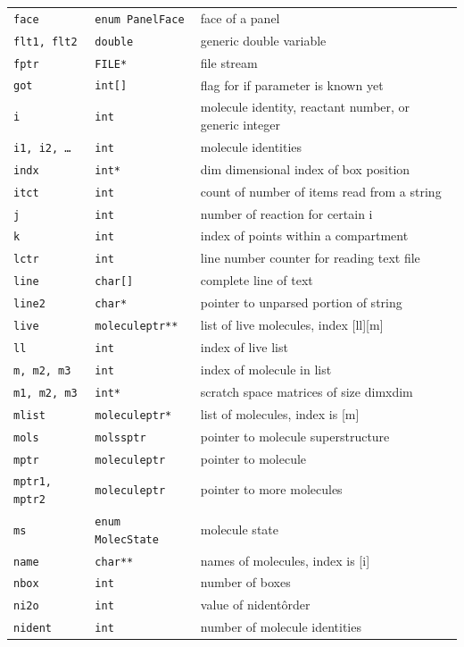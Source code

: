 \documentclass {scrbook}
\newcommand {\ttt} {\texttt}
\begin{document}
\begin{longtable}[c]{lll}
\ttt{face} & \ttt{enum PanelFace} & face of a panel\\
\ttt{flt1, flt2} & \ttt{double} & generic double variable\\
\ttt{fptr} & \ttt{FILE*} & file stream\\
\ttt{got} & \ttt{int[]} & flag for if parameter is known yet\\
\ttt{i} & \ttt{int} & molecule identity, reactant number, or generic integer\\
\ttt{i1, i2, \ldots} & \ttt{int} & molecule identities\\
\ttt{indx} & \ttt{int*} & dim dimensional index of box position\\
\ttt{itct} & \ttt{int} & count of number of items read from a string\\
\ttt{j} & \ttt{int} & number of reaction for certain i\\
\ttt{k} & \ttt{int} & index of points within a compartment\\
\ttt{lctr} & \ttt{int} & line number counter for reading text file\\
\ttt{line} & \ttt{char[]} & complete line of text\\
\ttt{line2} & \ttt{char*} & pointer to unparsed portion of string\\
\ttt{live} & \ttt{moleculeptr**} & list of live molecules, index [ll][m]\\
\ttt{ll} & \ttt{int} & index of live list\\
\ttt{m, m2, m3} & \ttt{int} & index of molecule in list\\
\ttt{m1, m2, m3} & \ttt{int*} & scratch space matrices of size dimxdim\\
\ttt{mlist} & \ttt{moleculeptr*} & list of molecules, index is [m]\\
\ttt{mols} & \ttt{molssptr} & pointer to molecule superstructure\\
\ttt{mptr} & \ttt{moleculeptr} & pointer to molecule\\
\ttt{mptr1, mptr2} & \ttt{moleculeptr} & pointer to more molecules\\
\ttt{ms} & \ttt{enum MolecState} & molecule state\\
\ttt{name} & \ttt{char**} & names of molecules, index is [i]\\
\ttt{nbox} & \ttt{int} & number of boxes\\
\ttt{ni2o} & \ttt{int} & value of nident\^order\\
\ttt{nident} & \ttt{int} & number of molecule identities\\

\end{longtable}
\end{document}
